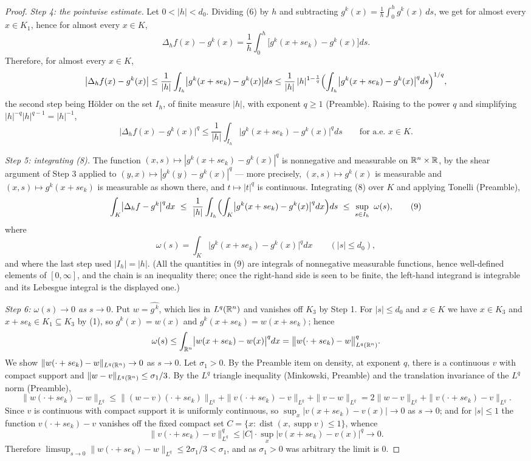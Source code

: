 \begin{proof}
\emph{Step 4: the pointwise estimate.}  Let $0<|h|<d_0$.  Dividing (6) by $h$
and subtracting $g^k(x)=\frac1h\int_0^hg^k(x)\,ds$, we get for almost every
$x\in K_1$, hence for almost every $x\in K$,
\[
\Delta_hf(x)-g^k(x)=\frac1h\int_0^h\bigl[g^k(x+se_k)-g^k(x)\bigr]ds .
\]
Therefore, for almost every $x\in K$,
\[
\bigl|\Delta_hf(x)-g^k(x)\bigr|
\le\frac1{|h|}\int_{I_h}\bigl|g^k(x+se_k)-g^k(x)\bigr|ds
\le\frac1{|h|}\,|h|^{1-\frac1q}\Bigl(\int_{I_h}\bigl|g^k(x+se_k)-g^k(x)\bigr|^qds\Bigr)^{1/q},
\]
the second step being H\"older on the set $I_h$, of finite measure $|h|$, with
exponent $q\ge1$ (Preamble).  Raising to the power $q$ and simplifying
$|h|^{-q}|h|^{q-1}=|h|^{-1}$,
\[
\bigl|\Delta_hf(x)-g^k(x)\bigr|^q
\le\frac1{|h|}\int_{I_h}\bigl|g^k(x+se_k)-g^k(x)\bigr|^qds
\qquad\text{for a.e. }x\in K .
\tag{8}
\]

\emph{Step 5: integrating (8).}  The function
$(x,s)\mapsto|g^k(x+se_k)-g^k(x)|^q$ is nonnegative and measurable on
$\mathbb{R}^n\times\mathbb{R}$, by the shear argument of Step 3 applied to
$(y,x)\mapsto|g^k(y)-g^k(x)|^q$ --- more precisely, $(x,s)\mapsto g^k(x)$ is
measurable and $(x,s)\mapsto g^k(x+se_k)$ is measurable as shown there, and
$t\mapsto|t|^q$ is continuous.  Integrating (8) over $K$ and applying Tonelli
(Preamble),
\[
\int_K\bigl|\Delta_hf-g^k\bigr|^qdx
\ \le\ \frac1{|h|}\int_{I_h}\Bigl(\int_K\bigl|g^k(x+se_k)-g^k(x)\bigr|^qdx\Bigr)ds
\ \le\ \sup_{s\in I_h}\ \omega(s),
\tag{9}
\]
where
\[
\omega(s)=\int_K\bigl|g^k(x+se_k)-g^k(x)\bigr|^qdx\qquad(|s|\le d_0),
\]
and where the last step used $|I_h|=|h|$.  (All the quantities in (9) are
integrals of nonnegative measurable functions, hence well-defined elements of
$[0,\infty]$, and the chain is an inequality there; once the right-hand side is
seen to be finite, the left-hand integrand is integrable and its Lebesgue
integral is the displayed one.)

\emph{Step 6: $\omega(s)\to0$ as $s\to0$.}  Put $w=\widehat{g^{\,k}}$, which
lies in $L^q(\mathbb{R}^n)$ and vanishes off $K_3$ by Step 1.  For $|s|\le d_0$ and
$x\in K$ we have $x\in K_3$ and $x+se_k\in K_1\subseteq K_3$ by (1), so
$g^k(x)=w(x)$ and $g^k(x+se_k)=w(x+se_k)$; hence
\[
\omega(s)\le\int_{\mathbb{R}^n}\bigl|w(x+se_k)-w(x)\bigr|^qdx
=\bigl\|w(\cdot+se_k)-w\bigr\|_{L^q(\mathbb{R}^n)}^q .
\]
We show $\|w(\cdot+se_k)-w\|_{L^q(\mathbb{R}^n)}\to0$ as $s\to0$.  Let $\sigma_1>0$.  By
the Preamble item on density, at exponent $q$, there is a continuous $v$ with
compact support and $\|w-v\|_{L^q(\mathbb{R}^n)}\le\sigma_1/3$.  By the $L^q$ triangle
inequality (Minkowski, Preamble) and the translation invariance of the $L^q$
norm (Preamble),
\[
\|w(\cdot+se_k)-w\|_{L^q}
\le\|(w-v)(\cdot+se_k)\|_{L^q}+\|v(\cdot+se_k)-v\|_{L^q}+\|v-w\|_{L^q}
=2\|w-v\|_{L^q}+\|v(\cdot+se_k)-v\|_{L^q}.
\]
Since $v$ is continuous with compact support it is uniformly continuous, so
$\sup_{x}|v(x+se_k)-v(x)|\to0$ as $s\to0$; and for $|s|\le1$ the function
$v(\cdot+se_k)-v$ vanishes off the fixed compact set
$C=\{x:\operatorname{dist}(x,\operatorname{supp}v)\le1\}$, whence
\[
\|v(\cdot+se_k)-v\|_{L^q}^q\le|C|\cdot\sup_x|v(x+se_k)-v(x)|^q\longrightarrow0 .
\]
Therefore $\limsup_{s\to0}\|w(\cdot+se_k)-w\|_{L^q}\le2\sigma_1/3<\sigma_1$, and
as $\sigma_1>0$ was arbitrary the limit is $0$.


\end{proof}
